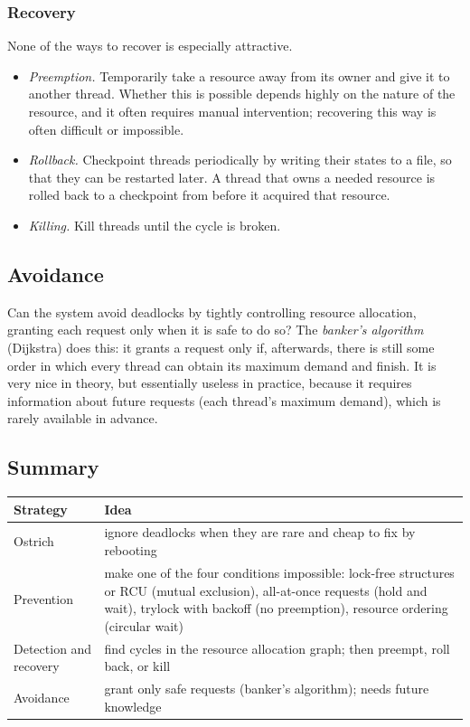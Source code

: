 \subsubsection{Recovery}
None of the ways to recover is especially attractive.
\begin{itemize}
  \item \emph{Preemption.} Temporarily take a resource away from its owner and give it to another thread. Whether this is possible depends highly on the nature of the resource, and it often requires manual intervention; recovering this way is often difficult or impossible.
  \item \emph{Rollback.} Checkpoint threads periodically by writing their states to a file, so that they can be restarted later. A thread that owns a needed resource is rolled back to a checkpoint from before it acquired that resource.
  \item \emph{Killing.} Kill threads until the cycle is broken.
\end{itemize}

\subsection{Avoidance}

Can the system avoid deadlocks by tightly controlling resource allocation, granting each request only when it is safe to do so? The \emph{banker's algorithm} (Dijkstra) does this: it grants a request only if, afterwards, there is still some order in which every thread can obtain its maximum demand and finish. It is very nice in theory, but essentially useless in practice, because it requires information about future requests (each thread's maximum demand), which is rarely available in advance.

\subsection{Summary}

\begin{keypoint}
  \begin{center}
  \begin{tabular}{lp{}}
    \toprule
    Strategy & Idea \\
    \midrule
    Ostrich & ignore deadlocks when they are rare and cheap to fix by rebooting \\
    Prevention & make one of the four conditions impossible: lock-free structures or RCU (mutual exclusion), all-at-once requests (hold and wait), trylock with backoff (no preemption), resource ordering (circular wait) \\
    Detection and recovery & find cycles in the resource allocation graph; then preempt, roll back, or kill \\
    Avoidance & grant only safe requests (banker's algorithm); needs future knowledge \\
    \bottomrule
  \end{tabular}
  \end{center}
\end{keypoint}

